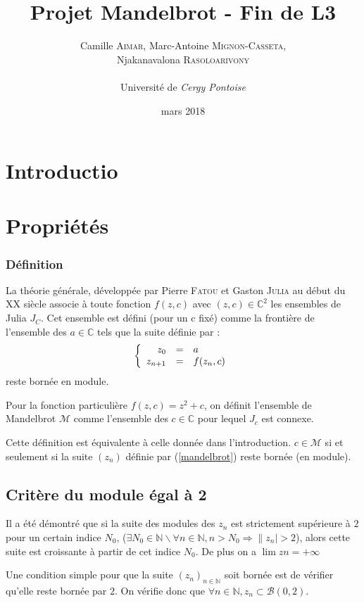 \documentclass[12pt,a4paper]{report}
\title{Projet Mandelbrot - Fin de L3}
\author{Camille \textsc{Aimar}, Marc-Antoine \textsc{Mignon-Casseta},\\Njakanavalona \textsc{Rasoloarivony} \\ \\ Université de\emph{ Cergy Pontoise}}
\date{mars 2018}
\theoremstyle{plain}
\begin{document}
\maketitle
\setcounter{chapter}{1}
\section{Introductio}

\newpage
\section{Propriétés}
	\subsubsection{Définition}
La théorie générale, développée par Pierre \textsc{Fatou} et Gaston \textsc{Julia} au début du \textsc{XX}\ieme {} siècle associe à toute fonction $f(z,c)$ avec $(z,c) \in \mathbb{C}^2$ les ensembles de Julia $J_C$. Cet ensemble est défini (pour un c fixé) comme la frontière de l'ensemble des $a \in \mathbb{C}$ tels que la suite définie par :
\begin{equation}\label{julia}
\left\{
\begin{array}{r c l}
z_0 &=& a\\
z_{n+1} &=& f(z_n, c)
\end{array}
\right.
\end{equation}
reste bornée en module.

\setlength{\parskip}{3 mm}
Pour la fonction particulière $f(z,c)=z^2+c$, on définit l'ensemble de Mandelbrot $\mathcal{M}$ comme l'ensemble des $c \in \mathbb{C}$ pour lequel $J_c$ est connexe.

Cette définition est équivalente à celle donnée dans l'introduction. $c \in \mathcal{M}$ si et seulement si la suite $(z_n)$ définie par (\ref{mandelbrot}) reste bornée (en module).

	\subsection{Critère du module égal à 2}
Il a été démontré que si la suite des modules des $z_n$ est strictement supérieure à $2$ pour un certain indice $N_0$,
($\exists N_0 \in \mathbb{N} \backslash \forall n \in \mathbb{N},{} n>N_0 \Longrightarrow \|z_n|>2$), alors cette suite est croissante à partir de cet indice $N_0$. De plus on a $\lim zn = +\infty$

Une condition simple pour que la suite $(z_n)_{n \in \mathbb{N}}$ soit bornée est de vérifier qu'elle reste bornée par $2$. On vérifie donc que $\forall n \in \mathbb{N}, z_n \subset \mathcal{B}(0,2)$. 
\end{document}
